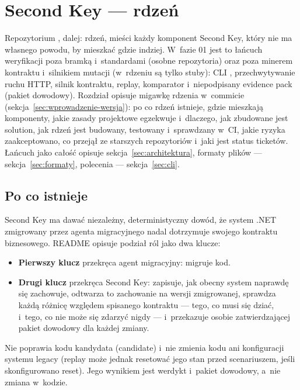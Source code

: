\section{Second Key --- rdzeń}\label{sec:rdzen}

Repozytorium , dalej: rdzeń, mieści każdy komponent Second Key,
który nie ma własnego powodu, by mieszkać gdzie indziej. W~fazie 01 jest to łańcuch
weryfikacji poza bramką i~standardami (osobne repozytoria) oraz poza minerem kontraktu
i~silnikiem mutacji (w~rdzeniu są tylko stuby): CLI , przechwytywanie ruchu HTTP,
silnik kontraktu, replay, komparator i~niepodpisany evidence pack (pakiet dowodowy). Rozdział opisuje migawkę
rdzenia w~commicie  (sekcja~\ref{sec:wprowadzenie-wersja}): po co rdzeń
istnieje, gdzie mieszkają komponenty,
jakie zasady projektowe egzekwuje i~dlaczego, jak zbudowane jest solution, jak rdzeń jest
budowany, testowany i~sprawdzany w~CI, jakie ryzyka zaakceptowano, co przejął ze starszych
repozytoriów i~jaki jest status ticketów. Łańcuch jako całość opisuje
sekcja~\ref{sec:architektura}, formaty plików --- sekcja~\ref{sec:formaty}, polecenia
 --- sekcja~\ref{sec:cli}.

\subsection{Po co istnieje}\label{sec:rdzen-cel}

Second Key ma dawać niezależny, deterministyczny dowód, że system .NET zmigrowany przez
agenta migracyjnego nadal dotrzymuje swojego kontraktu biznesowego. README opisuje podział
ról jako dwa klucze:

\begin{itemize}
  \item \textbf{Pierwszy klucz} przekręca agent migracyjny: migruje kod.
  \item \textbf{Drugi klucz} przekręca Second Key: zapisuje, jak obecny system naprawdę się
        zachowuje, odtwarza to zachowanie na wersji zmigrowanej, sprawdza każdą różnicę
        względem spisanego kontraktu --- tego, co musi się dziać, i~tego, co nie może się
        zdarzyć nigdy --- i~przekazuje osobie zatwierdzającej pakiet dowodowy dla każdej
        zmiany.
\end{itemize}

 Nie poprawia kodu kandydata (candidate) i~nie zmienia kodu ani konfiguracji systemu legacy (replay może jednak resetować jego stan przed scenariuszem, jeśli skonfigurowano reset). Jego wynikiem jest werdykt i~pakiet dowodowy, a~nie zmiana w~kodzie.

